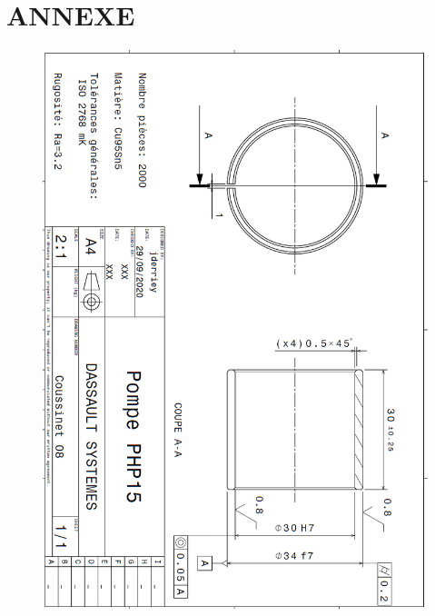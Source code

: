 \documentclass[
	11pt, %
	fleqn, %
	a4paper, %
]{LegrandOrangeBook}
\begin{document}
\section{ANNEXE}
 \begin{figure}[H] %
	\centering %
	\includegraphics[width=1\textwidth]{Images/D11.PNG} %

	\label{fig:placeholder} %
\end{figure}
\end{document}
